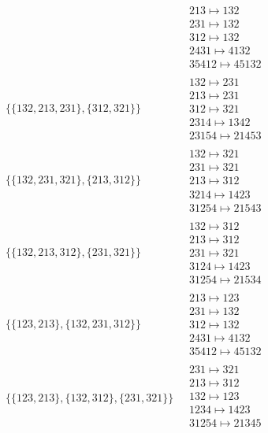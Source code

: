\begin{scriptsize}
\begin{align}
\ 
&
\begin{matrix}
213 \mapsto 132
\\
231 \mapsto 132
\\
312 \mapsto 132
\\
2431 \mapsto 4132
\\
35412 \mapsto 45132
\end{matrix}
\\
\{\{132, 213, 231\}, \{312, 321\}\}
\ 
&
\begin{matrix}
132 \mapsto 231
\\
213 \mapsto 231
\\
312 \mapsto 321
\\
2314 \mapsto 1342
\\
23154 \mapsto 21453
\end{matrix}
\\
\{\{132, 231, 321\}, \{213, 312\}\}
\ 
&
\begin{matrix}
132 \mapsto 321
\\
231 \mapsto 321
\\
213 \mapsto 312
\\
3214 \mapsto 1423
\\
31254 \mapsto 21543
\end{matrix}
\\
\{\{132, 213, 312\}, \{231, 321\}\}
\ 
&
\begin{matrix}
132 \mapsto 312
\\
213 \mapsto 312
\\
231 \mapsto 321
\\
3124 \mapsto 1423
\\
31254 \mapsto 21534
\end{matrix}
\\
\{\{123, 213\}, \{132, 231, 312\}\}
\ 
&
\begin{matrix}
213 \mapsto 123
\\
231 \mapsto 132
\\
312 \mapsto 132
\\
2431 \mapsto 4132
\\
35412 \mapsto 45132
\end{matrix}
\\
\{\{123, 213\}, \{132, 312\}, \{231, 321\}\}
\ 
&
\begin{matrix}
231 \mapsto 321
\\
213 \mapsto 312
\\
132 \mapsto 123
\\
1234 \mapsto 1423
\\
31254 \mapsto 21345
\\

\end{matrix}
\end{align}
\end{scriptsize}
